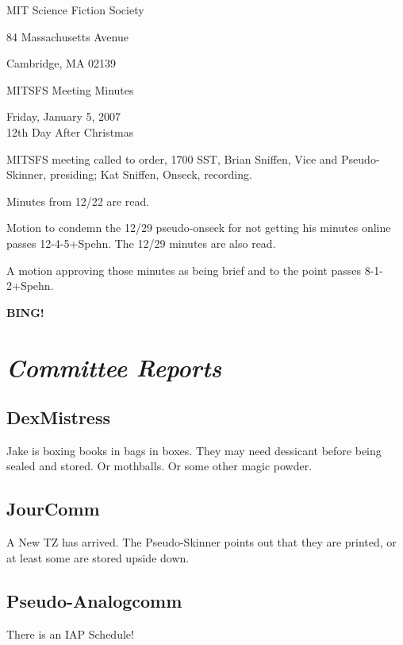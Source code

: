 \documentclass[10pt]{article}
\newcommand{\bing}{{\bf BING!} }
\newcommand{\goto}[1]{\bing \vskip 12pt \section*{{\em{#1}}}}
\begin{document}
\begin{center}

MIT Science Fiction Society

84 Massachusetts Avenue

Cambridge, MA 02139

\vspace{12pt}

MITSFS Meeting Minutes

Friday, January 5, 2007\\
12th Day After Christmas
\end{center}

\vspace{18pt}

\setlength{\parskip}{6pt}

\noindent
MITSFS meeting called to order, 1700 SST,
Brian Sniffen, Vice and Pseudo-Skinner, presiding; Kat Sniffen, Onseck, recording.

Minutes from 12/22 are read.

Motion to condemn the 12/29 pseudo-onseck for not getting his minutes
online passes 12-4-5+Spehn.  The 12/29 minutes are also read.

A motion approving those minutes as being brief and to the point
passes 8-1-2+Spehn.

\goto{Committee Reports}

\subsection*{DexMistress}
Jake is boxing books in bags in boxes. They may need dessicant before
being sealed and stored. Or mothballs. Or some other magic powder.


\subsection*{JourComm}
A New TZ has arrived. The Pseudo-Skinner points out that they are
printed, or at least some are stored upside down.

\subsection*{Pseudo-Analogcomm}
There is an IAP Schedule!
\end{document}
